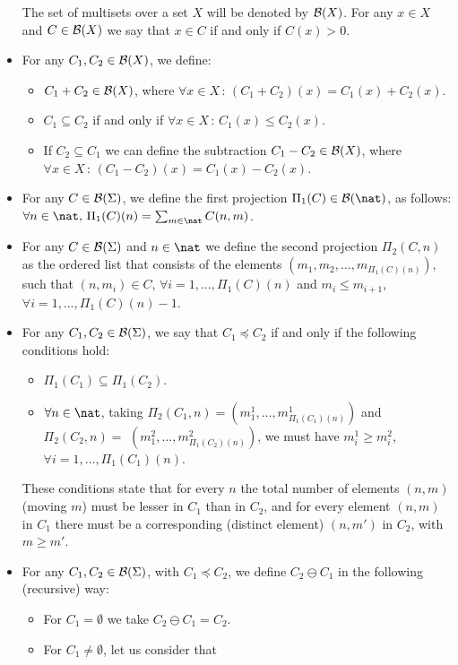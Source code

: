 \begin{itemize}
The set of multisets over a set $X$ will be denoted by ${\cal B}(X)$.
For any $x \in X$ and $C\in {\cal B}(X)$ we say that $x \in C$
if and only if $C(x)>0$.
%
%
\item For any $C_1, C_2 \in {\cal B}(X)$, we define:
  \begin{itemize}
  \item $C_1 + C_2 \in {\cal B}(X)$, where $\forall x \in X\,:\,
        (C_1+C_2)(x)= C_1(x) + C_2(x)$.
  \item $C_1 \subseteq C_2$ if and only if $\forall x \in X\,:\,
        C_1(x) \leq C_2(x)$.
  \item If $C_2 \subseteq C_1$ we can define the subtraction 
        $C_1 - C_2 \in {\cal B}(X)$, where $\forall x \in X\,:\,
        (C_1-C_2)(x)= C_1(x) - C_2(x)$.
  \end{itemize}
%
\item For any $C \in {\cal B}(\Sigma)$, 
we define the first projection
$\Pi_1(C) \in {\cal B}(\nat)$, 
as follows: $\forall n \in \nat,\,
\Pi_1(C)(n) = \sum_{m\in \nat} C(n,m)$.
%
\item For any $C \in {\cal B}(\Sigma)$
and $n\in \nat$ we define the second projection 
$\Pi_2(C,n)$ as the ordered list that consists of the
elements $(m_1,m_2,\ldots,m_{\Pi_1(C)(n)})$,
such that $(n,m_i) \in C$, $\forall i=1,\ldots, \Pi_1(C)(n)$
and $m_i \leq m_{i+1}$,
$\forall i=1,\ldots, \Pi_1(C)(n)-1$.
%
\item For any $C_1,C_2 \in {\cal B}(\Sigma)$, we say that
$C_1 \preceq C_2$ if and only if the following conditions hold:
  \begin{itemize}
  \item $\Pi_1(C_1) \subseteq \Pi_1(C_2)$.
  \item \mbox{$\forall n \in \nat$}, taking \mbox{$\Pi_2(C_1,n) = (m^1_1,\ldots,
        m^1_{\Pi_1(C_1)(n)})$} and
        \mbox{$\Pi_2(C_2,n) = $} \linebreak
        $(m^2_1,\ldots,m^2_{\Pi_1(C_2)(n)})$,
        we must have  $m^1_i \geq m^2_i$, $\forall i=1,\ldots,
        \Pi_1(C_1)(n)$.
  \end{itemize}
%
%  
These conditions state that for every $n$ the total number of
elements $(n,m)$ (moving $m$) must be lesser in $C_1$ than in $C_2$, and 
for every element $(n,m)$ in $C_1$ there must be a 
corresponding (distinct element) $(n,m')$ in $C_2$, with $m\geq m'$.
%
\item For any $C_1,C_2 \in {\cal B}(\Sigma)$, with $C_1 \preceq C_2$,
we define $C_2 \ominus C_1$ in the following (recursive) way: 
  \begin{itemize}
  \item For $C_1 = \emptyset$ we take $C_2 \ominus C_1 = C_2$.
  \item For $C_1 \neq \emptyset$, let us consider that 


\end{itemize}
\end{itemize}
